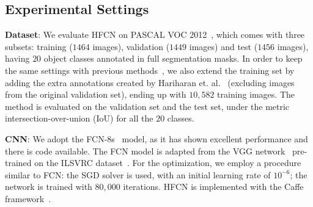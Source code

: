 \documentclass[runningheads]{llncs}
\makeatletter
\newcommand*{\etal}{et. al.\@\xspace}
\makeatother
\begin{document}
\subsection{Experimental Settings}
\textbf{Dataset}: We evaluate HFCN on PASCAL VOC
2012~\citep{pascal:2011}, which comes with three subsets: training
($1464$ images), validation ($1449$ images) and test ($1456$ images),
having $20$ object classes annotated in full segmentation masks. In
order to keep the same settings with previous
methods~\citep{Long_2015_CVPR, ConsCNN, cnn:em, whatpoint}, we also
extend the training set by adding the extra annotations created by
Hariharan \etal~\citep{semantic:contour} (excluding images from the
original validation set), ending up with $10,582$ training images. The
method is evaluated on the validation set and the test set, under the
metric intersection-over-union (IoU) for all the $20$ classes.

\textbf{CNN}: We adopt the
FCN-8s~\citep{Long_2015_CVPR} model, as it has shown excellent
performance and there is code available. The FCN model is adapted from
the VGG network~\citep{vgg16} pre-trained on the ILSVRC
dataset~\citep{imageNet:challenge}. For the optimization, we employ a
procedure similar to FCN: the SGD solver is used, with an initial
learning rate of $10^{-6}$; the network is trained with $80,000$
iterations.  HFCN is implemented with the Caffe
framework~\citep{Caffe}.%


\begin{table}[tb]
\centering
{}
\caption{The results of different methods with varying levels of supervision on the validation set of PASCAL VOC 2012.}
\label{table:val} \vspace{-4mm}
\end{table}
\end{document}
